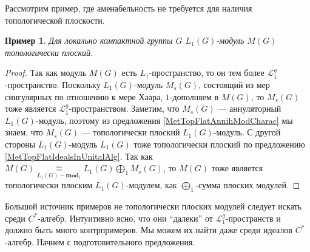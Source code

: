 \documentclass[12pt]{article}
\newtheorem{example}[theorem]{Пример}
\newcommand{\isom}[1]{\mathop{\mathbin{\cong}}\limits_{#1}}
\begin{document}
Рассмотрим пример, где аменабельность не требуется для наличия топологической плоскости.

\begin{example} Для локально компактной группы $G$ $L_1(G)$-модуль $M(G)$ топологически плоский.
\end{example}
\begin{proof}
Так как модуль $M(G)$ есть $L_1$-пространство, то он тем более $\mathcal{L}_1^g$-пространство. Поскольку $L_1(G)$-модуль $M_s(G)$, состоящий из мер сингулярных по отношению к мере Хаара, $1$-дополняем в $M(G)$, то $M_s(G)$ тоже является $\mathcal{L}_1^g$-пространством. Заметим, что $M_s(G)$ --- аннуляторный $L_1(G)$-модуль, поэтому из предложения \ref{MetTopFlatAnnihModCharac} мы знаем, что $M_s(G)$ --- топологически плоский $L_1(G)$-модуль. С другой стороны $L_1(G)$-модуль $L_1(G)$ тоже топологически плоский по предложению \ref{MetTopFlatIdealsInUnitalAlg}. Так как $M(G)\isom{L_1(G)-\mathbf{mod}_1}L_1(G)\bigoplus_1 M_s(G)$, то $M(G)$ тоже является топологически плоским $L_1(G)$-модулем, как  $\bigoplus_1$-сумма плоских модулей.
\end{proof}

Большой источник примеров не топологически плоских модулей следует искать среди $C^*$-алгебр. Интуитивно ясно, что они ``далеки'' от $\mathcal{L}_1^g$-пространств и должно быть много контрпримеров. Мы можем их найти даже среди идеалов $C^*$-алгебр. Начнем с подготовительного предложения.
\end{document}

